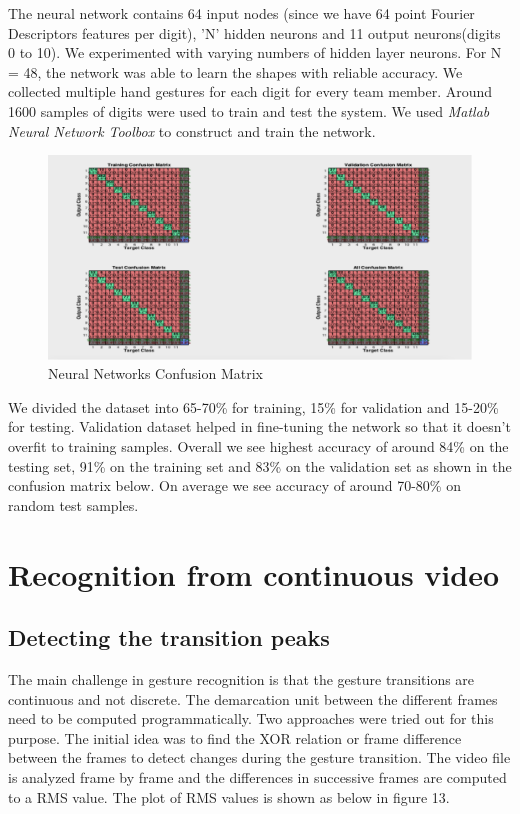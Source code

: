 \documentclass{acm} %
\begin{document}
The neural network contains 64 input nodes (since we have 64 point Fourier Descriptors features per digit), 'N' hidden neurons and 11 output neurons(digits 0 to 10). We experimented with varying numbers of hidden layer neurons. For N = 48, the network was able to learn the shapes with reliable accuracy. We collected multiple hand gestures for each digit for every team member. Around 1600 samples of digits were used to train and test the system. We used \textit{Matlab Neural Network Toolbox} to construct and train the network. 


\begin{figure}[h]
\centering
\includegraphics[width=3 in]{nn_confusion_matrix}
\caption{Neural Networks Confusion Matrix}
\label{fig:fig14}
\end{figure}


We divided the dataset into 65-70\% for training, 15\% for validation and 15-20\% for testing. Validation dataset helped in fine-tuning the network so that it doesn't overfit to training samples. Overall we see highest accuracy of around 84\% on the testing set, 91\% on the training set and 83\% on the validation set as shown in the confusion matrix below. On average we see accuracy of around 70-80\% on random test samples.


\section{Recognition from continuous video}
\subsection{Detecting the transition peaks}
The main challenge in gesture recognition is that the gesture transitions are continuous and not discrete. The demarcation unit between the different frames need to be computed programmatically. Two approaches were tried out for this purpose. The initial idea was to find the XOR relation or frame difference between the frames to detect changes during the gesture transition. The video file is analyzed frame by frame and the differences in successive frames are computed to a RMS value. The plot of RMS values is shown as below in figure 13.
\end{document}
